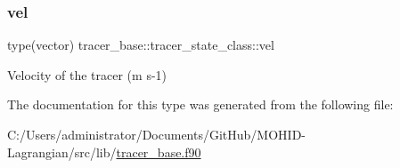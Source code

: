 \subsubsection{\texorpdfstring{vel}{vel}}
{\footnotesize\ttfamily type(vector) tracer\+\_\+base\+::tracer\+\_\+state\+\_\+class\+::vel\hspace{0.3cm}{\ttfamily [private]}}



Velocity of the tracer (m s-\/1) 



The documentation for this type was generated from the following file\+:\begin{DoxyCompactItemize}
\item 
C\+:/\+Users/administrator/\+Documents/\+Git\+Hub/\+M\+O\+H\+I\+D-\/\+Lagrangian/src/lib/\mbox{\hyperlink{tracer__base_8f90}{tracer\+\_\+base.\+f90}}\end{DoxyCompactItemize}

